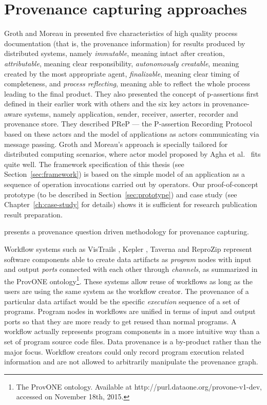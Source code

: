 \section{Provenance capturing approaches}
Groth and Moreau in \cite{groth2009recording} presented five characteristics of high quality process documentation (that is, the provenance information) for results produced by distributed systems, namely \emph{immutable}, meaning intact after creation, \emph{attributable}, meaning clear responsibility, \emph{autonomously creatable}, meaning created by the most appropriate agent, \emph{finalizable}, meaning clear timing of completeness, and \emph{process reflecting}, meaning able to reflect the whole process leading to the final product. They also presented the concept of p-assertions first defined in their earlier work with others \cite{groth2006architecture} and the six key actors in provenance-aware systems, namely application, sender, receiver, asserter, recorder and provenance store. They described PReP --- the P-assertion Recording Protocol based on these actors and the model of applications as actors communicating via message passing. Groth and Moreau's approach is specially tailored for distributed computing scenarios, where actor model proposed by Agha et al.~\cite{agha1985actors,agha1997foundation} fits quite well. The framework specification of this thesis (see Section~\ref{sec:framework}) is based on the simple model of an application as a sequence of operation invocations carried out by operators. Our proof-of-concept prototype (to be described in Section~\ref{sec:prototype}) and case study (see Chapter~\ref{ch:case-study} for details) shows it is sufficient for research publication result preparation.

\cite{miles2011prime} presents a provenance question driven methodology for provenance capturing.

Workflow systems such as VisTrails \cite{freire2014reproducibility}, Kepler \cite{ludascher2006scientific}, Taverna \cite{wolstencroft2013taverna} and ReproZip \cite{chirigati2013reprozip} represent software components able to create data artifacts as \emph{program} nodes with input and output \emph{ports} connected with each other through \emph{channels}, as summarized in the ProvONE ontology\footnote{The ProvONE ontology. Available at http://purl.dataone.org/provone-v1-dev, accessed on November 18th, 2015.}. These systems allow reuse of workflows as long as the users are using the same system as the workflow creator. The provenance of a particular data artifact would be the specific \emph{execution} sequence of a set of programs. Program nodes in workflows are unified in terms of input and output ports so that they are more ready to get reused than normal programs. A workflow actually represents program components in a more intuitive way than a set of program source code files. Data provenance is a by-product rather than the major focus. Workflow creators could only record program execution related information and are not allowed to arbitrarily manipulate the provenance graph.



